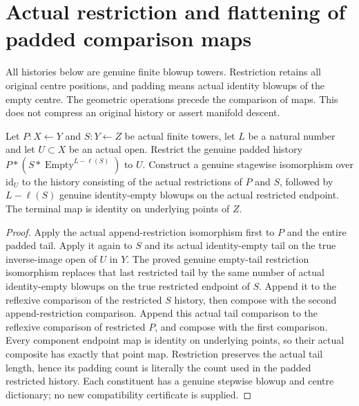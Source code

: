 \section{Actual restriction and flattening of padded comparison maps}

All histories below are genuine finite blowup towers. Restriction retains
all original centre positions, and padding means actual identity blowups of
the empty centre. The geometric operations precede the comparison of maps.
This does not compress an original history or assert manifold descent.

\begin{theorem}
\label{hir:sharp-actual-padded-history-open-flattening}
\leanok
Let $P:X\leftarrow Y$ and $S:Y\leftarrow Z$ be actual finite towers, let
$L$ be a natural number and let $U\subset X$ be an actual open.
Restrict the genuine padded history $P*(S*\operatorname{Empty}^{L-\ell(S)})$
to $U$. Construct a genuine stagewise isomorphism over $\mathrm{id}_U$
to the history consisting of the actual restrictions of $P$ and $S$,
followed by $L-\ell(S)$ genuine identity-empty blowups on the actual restricted
endpoint. The terminal map is identity on underlying points of $Z$.
\end{theorem}
\begin{proof}
Apply the actual append-restriction isomorphism first to $P$ and the entire
padded tail. Apply it again to $S$ and its actual identity-empty tail on the
true inverse-image open of $U$ in $Y$. The proved genuine empty-tail
restriction isomorphism replaces that last restricted tail by the same number
of actual identity-empty blowups on the true restricted endpoint of $S$.
Append it to the reflexive comparison of the restricted $S$ history, then
compose with the second append-restriction comparison. Append this actual
tail comparison to the reflexive comparison of restricted $P$, and compose
with the first comparison. Every component endpoint map is identity on
underlying points, so their actual composite has exactly that point map.
Restriction preserves the actual tail length, hence its padding count is
literally the count used in the padded restricted history. Each constituent
has a genuine stepwise blowup and centre dictionary; no new compatibility
certificate is supplied.
\end{proof}

